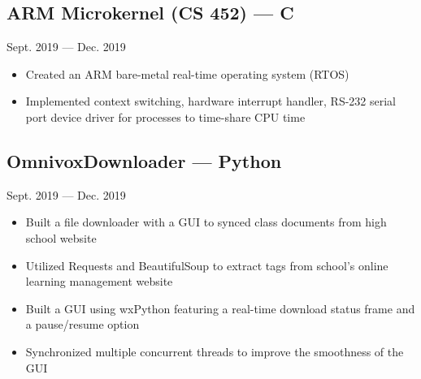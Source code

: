\documentclass[11pt]{extarticle}
\begin{document}
\subsection*{ARM Microkernel (CS 452) --- C} \hfill Sept. 2019 --- Dec. 2019
\begin{itemize}
  \item Created an ARM bare-metal real-time operating system (RTOS)
  \item Implemented context switching, hardware interrupt handler, RS-232 serial port device driver for processes to time-share CPU time
    \end{itemize}

\subsection*{OmnivoxDownloader --- Python} \hfill Sept. 2019 --- Dec. 2019
\begin{itemize}
  \item Built a file downloader with a GUI to synced class documents
    from high school website
  \item Utilized Requests and BeautifulSoup to
    extract tags from school's online learning management website
  \item Built a GUI using wxPython featuring
    a real-time download status frame and a pause/resume option
  \item Synchronized multiple concurrent threads to improve the smoothness
    of the GUI
\end{itemize}
\end{document}
